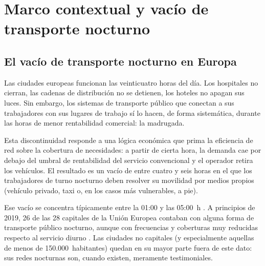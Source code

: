 


\section{Marco contextual y vacío de transporte nocturno}\label{cap:marco-contextual}

\subsection{El vacío de transporte nocturno en Europa}
\label{sec:vacio-nocturno}

Las ciudades europeas funcionan las veinticuatro horas del día. Los
hospitales no cierran, las cadenas de distribución no se detienen, los
hoteles no apagan sus luces. Sin embargo, los sistemas de transporte
público que conectan a sus trabajadores con sus lugares de trabajo sí lo
hacen, de forma sistemática, durante las horas de menor rentabilidad
comercial: la madrugada.

Esta discontinuidad responde a una lógica
económica que prima la eficiencia de red sobre la cobertura de necesidades:
a partir de cierta hora, la demanda cae por debajo del umbral de rentabilidad
del servicio convencional y el operador retira los vehículos. El resultado
es un vacío de entre cuatro y seis horas en el que los trabajadores de turno
nocturno deben resolver su movilidad por medios propios (vehículo
privado, taxi o, en los casos más vulnerables, a pie).

\begin{claimS}
Ese vacío se concentra típicamente entre la 01:00 y las 05:00~h
\parencite{PlyushetvaBoussauw2020}. A principios de 2019, 26 de las 28 capitales de
la Unión Europea contaban con alguna forma de transporte público nocturno,
aunque con frecuencias y coberturas muy reducidas respecto al servicio diurno
\parencite{PlyushetvaBoussauw2020}. Las ciudades no capitales (y especialmente
aquellas de menos de 150.000~habitantes) quedan en su mayor parte fuera
de este dato: sus redes nocturnas son, cuando existen, meramente testimoniales.
\end{claimS}

